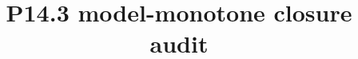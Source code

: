 \documentclass[11pt]{amsart}
\theoremstyle{remark}
\begin{document}
\title{P14.3 model-monotone closure audit}
\maketitle


\end{document}
